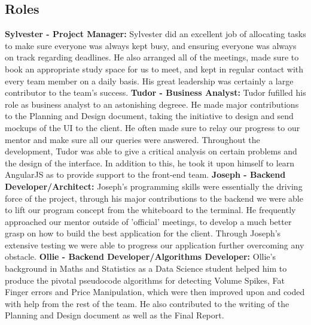 \documentclass[12pt]{article}
\begin{document}
  \subsection{Roles}
  \textbf{Sylvester - Project Manager:}\newline
  Sylvester did an excellent job of allocating tasks to make sure everyone was always kept busy, and ensuring everyone was always on track regarding deadlines.
  He also arranged all of the meetings, made sure to book an appropriate study space for us to meet, and kept in regular contact with every team member on a daily basis.
  His great leadership was certainly a large contributor to the team’s success.
  \newline\newline\textbf{Tudor - Business Analyst:}\newline
  Tudor fufilled his role as business analyst to an astonishing degreee. He made major contributions to the Planning and Design document, taking the initiative to design and send mockups of the UI to the client.
  He often made sure to relay our progress to our mentor and make sure all our queries were answered. Throughout the development, Tudor was able to give a critical analysis on certain problems and
  the design of the interface. In addition to this, he took it upon himself to learn AngularJS as to provide support to the front-end team.
  \newline\newline\textbf{Joseph - Backend Developer/Architect:}\newline
  Joseph's programming skills were essentially the driving force of the project, through his major contributions to the backend we were able to lift our program concept from the whiteboard to the terminal.
  He frequently approached our mentor outside of 'official' meetings, to develop a much better grasp on how to build the best application for the client. Through Joseph's extensive testing we were able
  to progress our application further overcoming any obstacle.
  \newline\newline\textbf{Ollie - Backend Developer/Algorithms Developer:}\newline
  Ollie’s background in Maths and Statistics as a Data Science student helped him to produce the pivotal pseudocode algorithms for detecting  Volume Spikes, Fat Finger errors and Price Manipulation,
  which were then improved upon and coded with help from the rest of the team. He also contributed to the writing of the Planning and Design document as well as the Final Report.
\end{document}
